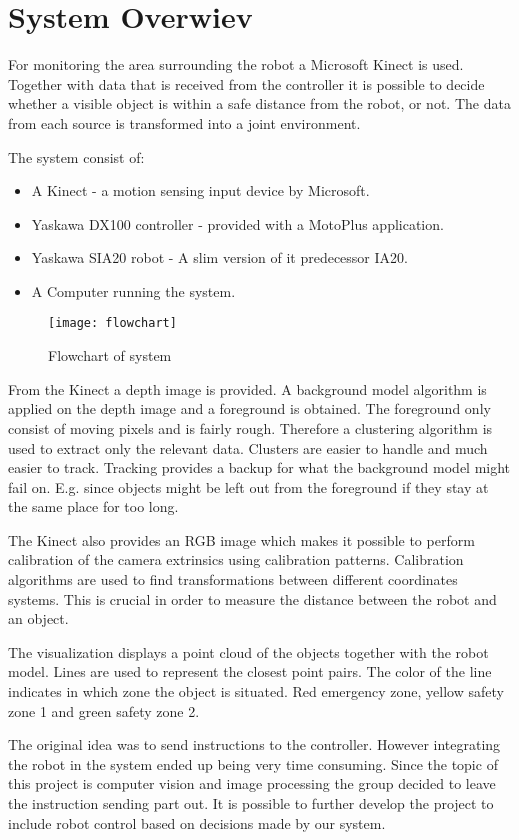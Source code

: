 
\section{System Overwiev}

For monitoring the area surrounding the robot a Microsoft Kinect is used. Together with data that is received from the controller it is possible to decide whether a visible object is within a safe distance from the robot, or not. The data from each source is transformed into a joint environment.

The system consist of:
\begin{itemize}
\item A Kinect - a motion sensing input device by Microsoft.
\item Yaskawa DX100 controller - provided with a MotoPlus application.
\item Yaskawa SIA20 robot - A slim version of it predecessor IA20.
\item A Computer running the system.
\end{itemize}

\begin{figure}[H]
\begin{center}
\texttt{[image: flowchart]}
\caption{Flowchart of system}
\label{flowchart}
\end{center}
\end{figure}




From the Kinect a depth image is provided. A background model algorithm is applied on the depth image and a foreground is obtained. The foreground only consist of moving pixels and is fairly rough. Therefore a clustering algorithm is used to extract only the relevant data. Clusters are easier to handle and much easier to track. Tracking provides a backup for what the background model might fail on. E.g. since objects might be left out from the foreground if they stay at the same place for too long.

The Kinect also provides an RGB image which makes it possible to perform calibration of the camera extrinsics using calibration patterns. Calibration algorithms are used to find transformations between different coordinates systems. This is crucial in order to measure the distance between the robot and an object.

The visualization displays a point cloud of the objects together with the robot model. Lines are used to represent the closest point pairs. The color of the line indicates in which zone the object is situated. Red emergency zone, yellow safety zone 1 and green safety zone 2.

The original idea was to send instructions to the controller. However integrating the robot in the system ended up being very time consuming. Since the topic of this project is computer vision and image processing the group decided to leave the instruction sending part out. It is possible to further develop the project to include robot control based on decisions made by our system.   


